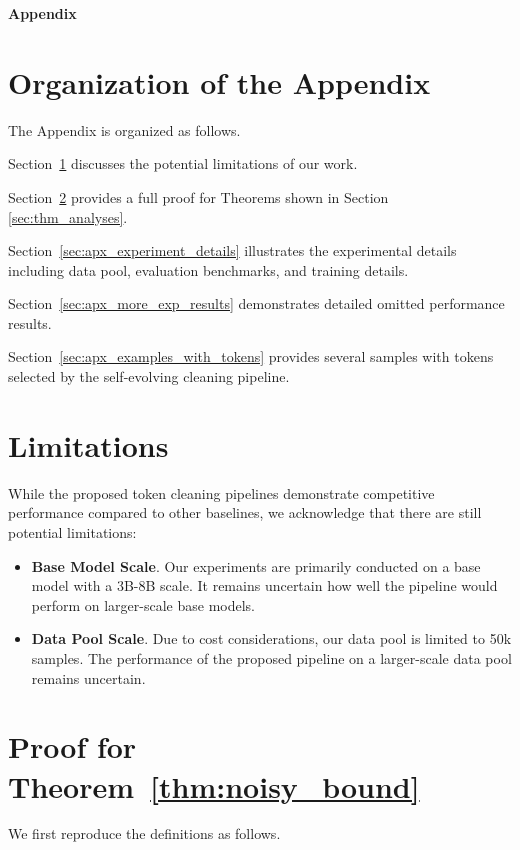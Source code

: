 
{\LARGE \bf Appendix}


\section*{Organization of the Appendix}
The Appendix is organized as follows. 
\squishlist
    \item Section~\ref{sec:apdx_limitations} discusses the potential limitations of our work.
    \item Section~\ref{app:proof_noisy_bound} provides a full proof for Theorems shown in Section \ref{sec:thm_analyses}.
    \item Section~\ref{sec:apx_experiment_details} illustrates the experimental details including data pool, evaluation benchmarks, and training details.
    \item Section~\ref{sec:apx_more_exp_results} demonstrates detailed omitted performance results. 
    \item Section~\ref{sec:apx_examples_with_tokens} provides several samples with tokens selected by the self-evolving cleaning pipeline.
\squishend


\section{Limitations}\label{sec:apdx_limitations}

While the proposed token cleaning pipelines demonstrate competitive performance compared to other baselines, we acknowledge that there are still potential limitations:
\begin{itemize}[left=-2pt]
    \item \textbf{Base Model Scale}. Our experiments are primarily conducted on a base model with a 3B-8B scale. It remains uncertain how well the pipeline would perform on larger-scale base models.
    \item \textbf{Data Pool Scale}. Due to cost considerations, our data pool is limited to 50k samples.  The performance of the proposed pipeline on a larger-scale data pool remains uncertain.
\end{itemize}


\section{Proof for Theorem~\ref{thm:noisy_bound}}\label{app:proof_noisy_bound}

We first reproduce the definitions as follows.


